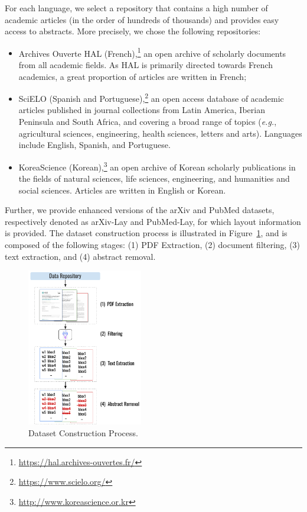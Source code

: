 For each language, we select a repository that contains a high number of academic articles (in the order of hundreds of thousands) and provides easy access to abstracts. 
More precisely, we chose the following repositories:
\begin{itemize}
    \item Archives Ouverte HAL (French),\footnote{\url{https://hal.archives-ouvertes.fr/}} an open archive of scholarly documents from all academic fields. As HAL is primarily directed towards French academics, a great proportion of articles are written in French;
    \item SciELO (Spanish and Portuguese),\footnote{\url{https://www.scielo.org/}} an open access database of academic articles published in journal collections from Latin America, Iberian Peninsula and South Africa, and covering a broad range of topics (\textit{e.g.}, agricultural sciences, engineering, health sciences, letters and arts). Languages include English, Spanish, and Portuguese.
    \item KoreaScience (Korean),\footnote{\url{http://www.koreascience.or.kr}} an open archive of Korean scholarly publications in the fields of natural sciences, life sciences, engineering, and humanities and social sciences. Articles are written in English or Korean.
\end{itemize}

Further, we provide enhanced versions of the arXiv and PubMed datasets, respectively denoted as arXiv-Lay and PubMed-Lay, for which layout information is provided. The dataset construction process is illustrated in Figure~\ref{fig:dataset-construction}, and is composed of the following stages: (1) PDF Extraction, (2) document filtering, (3) text extraction, and (4) abstract removal.

\begin{figure}
\centering
    \includegraphics[width=0.45\textwidth]{images/chapter5/Dataset_Construction_Process.pdf}
  \caption{Dataset Construction Process.}
  \label{fig:dataset-construction}
\end{figure}


